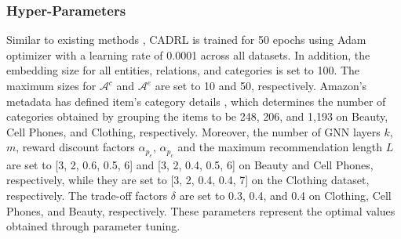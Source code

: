 \documentclass[conference]{IEEEtran}
\begin{document}
\subsubsection{Hyper-Parameters}
Similar to existing methods \cite{ADAC} \cite{CogER}, CADRL is trained for 50 epochs using Adam optimizer  with a learning rate of 0.0001 across  all datasets. In addition, the embedding size for all entities, relations, and categories is set to 100. The maximum sizes for  $\mathcal{A}^c$ and $\mathcal{A}^e$ are set to 10 and 50, respectively. %
Amazon’s metadata has defined item’s category details \cite{PGPR}, which determines the number of categories obtained by grouping the items to be 248, 206, and 1,193 on Beauty, Cell Phones, and Clothing, respectively. Moreover, the number of GNN layers $k$, $m$, reward discount factors $\alpha_{p_e}$, $\alpha_{p_c}$ and the maximum recommendation length $L$ are set to [3, 2,  0.6, 0.5, 6] and [3, 2,  0.4, 0.5, 6] on Beauty and Cell Phones, respectively, while they are set to [3, 2,  0.4, 0.4, 7] on the Clothing dataset, respectively. The trade-off factors $\delta$ are set to 0.3, 0.4, and 0.4 on Clothing, Cell Phones, and Beauty, respectively. These parameters represent the optimal values obtained through parameter tuning.
\end{document}
